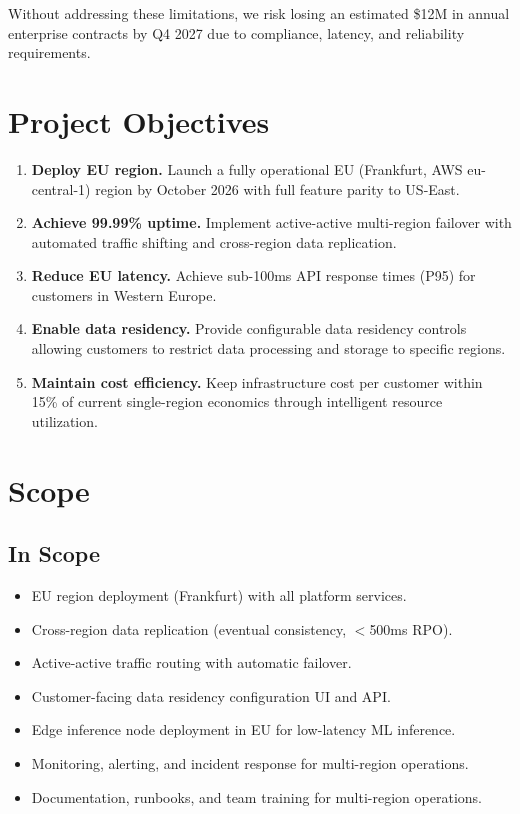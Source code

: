 \documentclass[
    language=english,
    doctype=project-charter,
    institution=none,
]{../../omnilatex}
\begin{document}
Without addressing these limitations, we risk losing an estimated \$12M in
annual enterprise contracts by Q4 2027 due to compliance, latency, and
reliability requirements.

\section{Project Objectives}

\begin{enumerate}
    \item \textbf{Deploy EU region.} Launch a fully operational EU
        (Frankfurt, AWS eu-central-1) region by October 2026 with full
        feature parity to US-East.
    \item \textbf{Achieve 99.99\% uptime.} Implement active-active
        multi-region failover with automated traffic shifting and
        cross-region data replication.
    \item \textbf{Reduce EU latency.} Achieve sub-100ms API response times
        (P95) for customers in Western Europe.
    \item \textbf{Enable data residency.} Provide configurable data
        residency controls allowing customers to restrict data processing
        and storage to specific regions.
    \item \textbf{Maintain cost efficiency.} Keep infrastructure cost per
        customer within 15\% of current single-region economics through
        intelligent resource utilization.
\end{enumerate}

\section{Scope}

\subsection{In Scope}

\begin{itemize}
    \item EU region deployment (Frankfurt) with all platform services.
    \item Cross-region data replication (eventual consistency, $<$500ms RPO).
    \item Active-active traffic routing with automatic failover.
    \item Customer-facing data residency configuration UI and API.
    \item Edge inference node deployment in EU for low-latency ML inference.
    \item Monitoring, alerting, and incident response for multi-region
          operations.
    \item Documentation, runbooks, and team training for multi-region
          operations.
\end{itemize}
\end{document}
